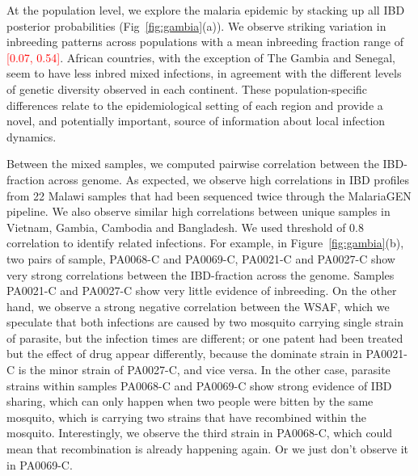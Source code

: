 \documentclass[9pt,lineno]{elife}
\begin{document}
At the population level, we explore the malaria epidemic by stacking up all IBD posterior probabilities (Fig~\ref{fig:gambia}(a)). We observe striking variation in inbreeding patterns across populations with a mean inbreeding fraction range of \textcolor{red}{[0.07, 0.54]}. African countries, with the exception of The Gambia and Senegal, seem to have less inbred mixed infections, in agreement with the different levels of genetic diversity observed in each continent. These population-specific differences relate to the epidemiological setting of each region and provide a novel, and potentially important, source of information about local infection dynamics.

Between the mixed samples, we computed pairwise correlation between the IBD-fraction across genome. As expected, we observe high correlations in IBD profiles from 22 Malawi samples that had been sequenced twice through the MalariaGEN pipeline. We also observe similar high correlations between unique samples in Vietnam, Gambia, Cambodia and Bangladesh. We used threshold of 0.8 correlation to identify related infections. For example, in Figure~\ref{fig:gambia}(b), two pairs of sample, PA0068-C and PA0069-C, PA0021-C and PA0027-C show very strong correlations between the IBD-fraction across the genome. Samples PA0021-C and PA0027-C show very little evidence of inbreeding. On the other hand, we observe a strong negative correlation between the WSAF, which we speculate that both infections are caused by two mosquito carrying single strain of parasite, but the infection times are different; or one patent had been treated but the effect of drug appear differently, because the dominate strain in PA0021-C is the minor strain of PA0027-C, and vice versa. In the other case, parasite strains within samples PA0068-C and PA0069-C show strong evidence of IBD sharing, which can only happen when two people were bitten by the same mosquito, which is carrying two strains that have recombined within the mosquito. Interestingly, we observe the third strain in PA0068-C, which could mean that recombination is already happening again. Or we just don't observe it in PA0069-C.



\end{document}
